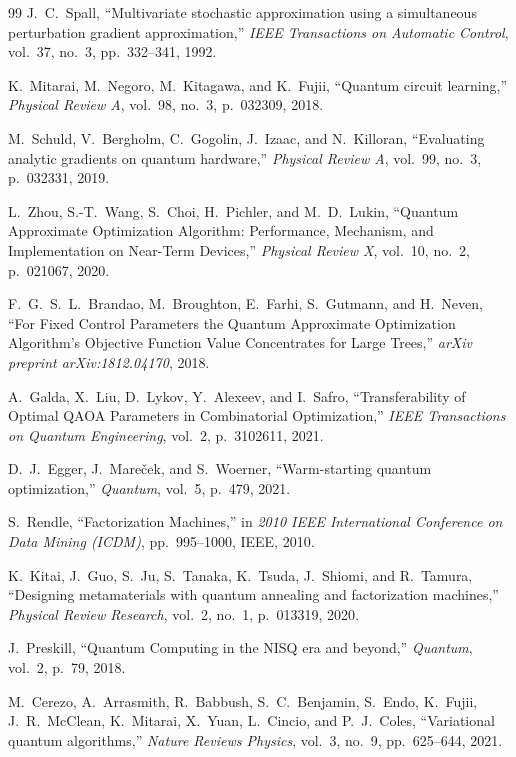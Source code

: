 \documentclass[11pt,a4paper,oneside,openany]{ltjsbook}
\theoremstyle{definition}
\theoremstyle{plain}
\theoremstyle{remark}
\begin{document}
\begin{thebibliography}{99}
J.~C.~Spall,
\newblock ``Multivariate stochastic approximation using a simultaneous perturbation gradient approximation,''
\newblock \textit{IEEE Transactions on Automatic Control}, vol.~37, no.~3, pp.~332--341, 1992.

K.~Mitarai, M.~Negoro, M.~Kitagawa, and K.~Fujii,
\newblock ``Quantum circuit learning,''
\newblock \textit{Physical Review A}, vol.~98, no.~3, p.~032309, 2018.

M.~Schuld, V.~Bergholm, C.~Gogolin, J.~Izaac, and N.~Killoran,
\newblock ``Evaluating analytic gradients on quantum hardware,''
\newblock \textit{Physical Review A}, vol.~99, no.~3, p.~032331, 2019.

L.~Zhou, S.-T.~Wang, S.~Choi, H.~Pichler, and M.~D.~Lukin,
\newblock ``Quantum Approximate Optimization Algorithm: Performance, Mechanism, and Implementation on Near-Term Devices,''
\newblock \textit{Physical Review X}, vol.~10, no.~2, p.~021067, 2020.

F.~G.~S.~L.~Brandao, M.~Broughton, E.~Farhi, S.~Gutmann, and H.~Neven,
\newblock ``For Fixed Control Parameters the Quantum Approximate Optimization Algorithm's Objective Function Value Concentrates for Large Trees,''
\newblock \textit{arXiv preprint arXiv:1812.04170}, 2018.

A.~Galda, X.~Liu, D.~Lykov, Y.~Alexeev, and I.~Safro,
\newblock ``Transferability of Optimal QAOA Parameters in Combinatorial Optimization,''
\newblock \textit{IEEE Transactions on Quantum Engineering}, vol.~2, p.~3102611, 2021.

D.~J.~Egger, J.~Mare{\v{c}}ek, and S.~Woerner,
\newblock ``Warm-starting quantum optimization,''
\newblock \textit{Quantum}, vol.~5, p.~479, 2021.

S.~Rendle,
\newblock ``Factorization Machines,''
\newblock in \textit{2010 IEEE International Conference on Data Mining (ICDM)}, pp.~995--1000, IEEE, 2010.

K.~Kitai, J.~Guo, S.~Ju, S.~Tanaka, K.~Tsuda, J.~Shiomi, and R.~Tamura,
\newblock ``Designing metamaterials with quantum annealing and factorization machines,''
\newblock \textit{Physical Review Research}, vol.~2, no.~1, p.~013319, 2020.

J.~Preskill,
\newblock ``Quantum Computing in the {NISQ} era and beyond,''
\newblock \textit{Quantum}, vol.~2, p.~79, 2018.

M.~Cerezo, A.~Arrasmith, R.~Babbush, S.~C.~Benjamin, S.~Endo, K.~Fujii, J.~R.~McClean, K.~Mitarai, X.~Yuan, L.~Cincio, and P.~J.~Coles,
\newblock ``Variational quantum algorithms,''
\newblock \textit{Nature Reviews Physics}, vol.~3, no.~9, pp.~625--644, 2021.

\end{thebibliography}
\end{document}
